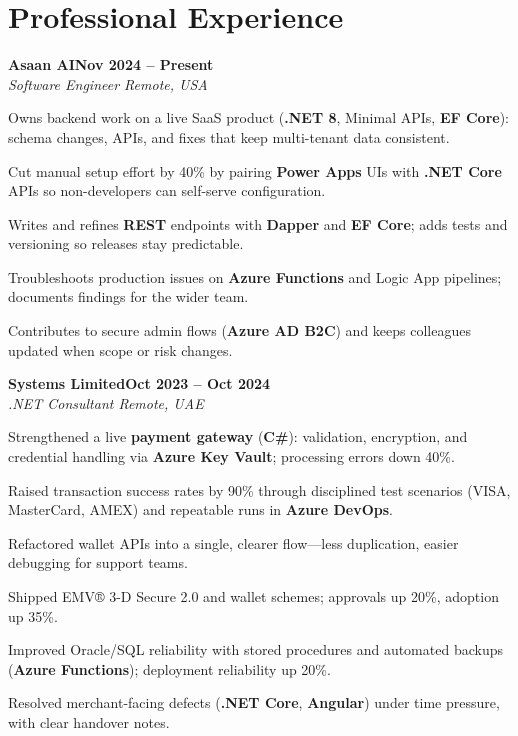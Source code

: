 \documentclass[letterpaper,10pt]{article}
\newcommand{\headingBf}[2]{
  \hspace{10pt}\textbf{#1}\hfill\textbf{#2}\\
}
\newcommand{\headingIt}[2]{
  \hspace{10pt}\textit{#1}\hfill\textit{#2}\\
}
\newenvironment{resume_list}{
  \vspace{-7pt}
  \begin{itemize}[itemsep=-2px, parsep=1pt, leftmargin=30pt]
}{
  \end{itemize}
}
\begin{document}
\section{Professional Experience}

\headingBf{Asaan AI}{Nov 2024 -- Present}
\headingIt{Software Engineer \hfill Remote, USA}{}
\begin{resume_list}
    \item Owns backend work on a live SaaS product (\textbf{.NET 8}, Minimal APIs, \textbf{EF Core}): schema changes, APIs, and fixes that keep multi-tenant data consistent.
    \item Cut manual setup effort by 40\% by pairing \textbf{Power Apps} UIs with \textbf{.NET Core} APIs so non-developers can self-serve configuration.
    \item Writes and refines \textbf{REST} endpoints with \textbf{Dapper} and \textbf{EF Core}; adds tests and versioning so releases stay predictable.
    \item Troubleshoots production issues on \textbf{Azure Functions} and Logic App pipelines; documents findings for the wider team.
    \item Contributes to secure admin flows (\textbf{Azure AD B2C}) and keeps colleagues updated when scope or risk changes.
\end{resume_list}

\headingBf{Systems Limited}{Oct 2023 -- Oct 2024}
\headingIt{.NET Consultant \hfill Remote, UAE}{}
\begin{resume_list}
    \item Strengthened a live \textbf{payment gateway} (\textbf{C\#}): validation, encryption, and credential handling via \textbf{Azure Key Vault}; processing errors down 40\%.
    \item Raised transaction success rates by 90\% through disciplined test scenarios (VISA, MasterCard, AMEX) and repeatable runs in \textbf{Azure DevOps}.
    \item Refactored wallet APIs into a single, clearer flow---less duplication, easier debugging for support teams.
    \item Shipped EMV® 3-D Secure 2.0 and wallet schemes; approvals up 20\%, adoption up 35\%.
    \item Improved Oracle/SQL reliability with stored procedures and automated backups (\textbf{Azure Functions}); deployment reliability up 20\%.
    \item Resolved merchant-facing defects (\textbf{.NET Core}, \textbf{Angular}) under time pressure, with clear handover notes.
\end{resume_list}
\end{document}

